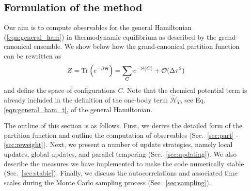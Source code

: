 


\subsection{Formulation of the method}  
Our aim is to compute observables  for the general Hamiltonian  (\ref{eqn:general_ham}) in
 thermodynamic equilibrium as described by the grand-canonical ensemble.
We show below  how the grand-canonical partition function can be rewritten as 
\begin{equation}
Z = \mathop{\mathrm{Tr}}{\left(e^{-\beta \hat{\mathcal{H}} }\right)}
= \sum_{C} e^{-S(C) } + \mathcal{O}(\Delta\tau^{2})
\end{equation}
and define the space of configurations  $C$.
Note that the chemical potential term is already included in the definition of the one-body term ${\mathcal{\hat{H}}_{T}}$, see Eq. \eqref{eqn:general_ham_t}, of the general Hamiltonian.  

The outline of this section is as follows. First, we derive the detailed form of the partition function and outline the computation of observables (Sec.~\ref{sec:part} - \ref{sec:reweight}). 
Next, we present a number of update strategies, namely local updates, global updates, and parallel tempering (Sec.~\ref{sec:updating}). 
We also describe the measures we have implemented to make the code numerically stable (Sec.~\ref{sec:stable}). Finally, we discuss the autocorrelations and associated time scales during the 
Monte Carlo sampling process (Sec.~\ref{sec:sampling}). 


